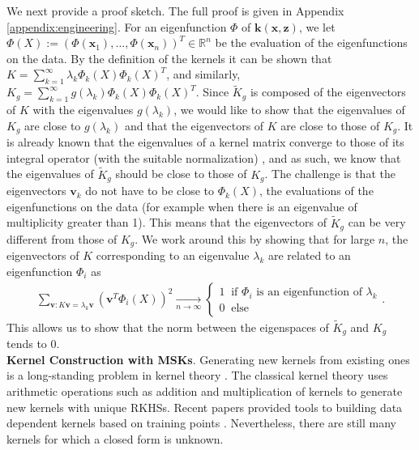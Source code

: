 \documentclass[10pt]{article} %
\theoremstyle{plain}
\theoremstyle{definition}
\theoremstyle{remark}
\newcommand{\Real}{\mathbb{R}}
\newcommand{\vv}{\mathbf{v}}
\newcommand{\x}{\mathbf{x}}
\newcommand{\z}{\mathbf{z}}
\newcommand{\kr}{\boldsymbol{k}}
\begin{document}
We next provide a proof sketch. The full proof is given in Appendix \ref{appendix:engineering}. For an eigenfunction $\Phi$ of $\kr(\x,\z)$, we let $\Phi(X):=(\Phi(\x_1),\ldots,\Phi(\x_n))^T\in\Real^n$ be the evaluation of the eigenfunctions on the data. By the definition of the kernels it can be shown that $K=\sum_{k=1}^\infty\lambda_k\Phi_k(X)\Phi_k(X)^T$,  and similarly, $K_g=\sum_{k=1}^\infty g(\lambda_k)\Phi_k(X)\Phi_k(X)^T$. Since $\tilde K_g$ is composed of the eigenvectors of $K$ with the eigenvalues $g(\lambda_k)$, we would like to show that the eigenvalues of $K_g$ are close to $g(\lambda_k)$ and that the eigenvectors of $K$ are close to those of $K_g$. It is already known that the eigenvalues of a kernel matrix converge to those of its integral operator (with the suitable normalization) \citep{rosasco2010learning}, and as such, we know that the eigenvalues of $\tilde K_g$ should be close to those of $K_g$. The challenge is that the eigenvectors $\vv_k$ do not have to be close to $\Phi_k(X)$, the evaluations of the eigenfunctions on the data (for example when there is an eigenvalue of multiplicity greater than 1). This means that the eigenvectors of $\tilde K_g$ can be very different from those of $K_g$. We work around this by showing that for large $n$, the eigenvectors of $K$ corresponding to an eigenvalue $\lambda_k$ are related to an eigenfunction $\Phi_i$ as
\begin{align*}
\sum_{\vv:K\vv=\lambda_k \vv}(\vv^T\Phi_i(X))^2\underset{n\to\infty}{\longrightarrow} 
\begin{cases} 1~ \text{ if } \Phi_i \text{ is an eigenfunction of } \lambda_k\\
0 ~ \text{ else}
\end{cases}.
\end{align*}
This allows us to show that the norm between the eigenspaces of $\tilde K_g$ and $K_g$ tends to 0. \\

\noindent\textbf{Kernel Construction with MSKs}.
Generating new kernels from existing ones is a long-standing problem in kernel theory \citep{saitoh2016theory}. The classical kernel theory uses arithmetic operations such as addition and multiplication of kernels to generate new kernels with unique RKHSs. Recent papers provided tools to building data dependent kernels based on training points \citep{simon2022kernel,sindhwani2005beyond,ionescu2017large} . Nevertheless, there are still many kernels for which a closed form is unknown. 
\end{document}
